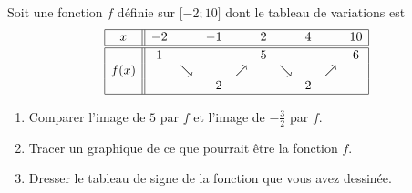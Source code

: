 
\begin{exercice}\label{exosmath-0546}

    Soit une fonction \( f\) définie sur \( \mathopen[ -2; 10 \mathclose]\) dont le tableau de variations est
    \begin{equation*}
        \begin{array}[]{|c||ccccccccc|}
            \hline
            x&-2&&-1&&2&&4&&10\\
            \hline\hline
            &1&&&&5&&&&6\\
            f(x)&&\searrow&&\nearrow&&\searrow&&\nearrow&\\
            &&&-2&&&&2&&\\
            \hline
        \end{array}
    \end{equation*}
    \begin{enumerate}
        \item
            Comparer l'image de \( 5\) par \( f\) et l'image de \( -\frac{ 3 }{2}\) par \( f\). 
        \item
            Tracer un graphique de ce que pourrait être la fonction \( f\).
        \item
            Dresser le tableau de signe de la fonction que vous avez dessinée.
    \end{enumerate}

\end{exercice}

